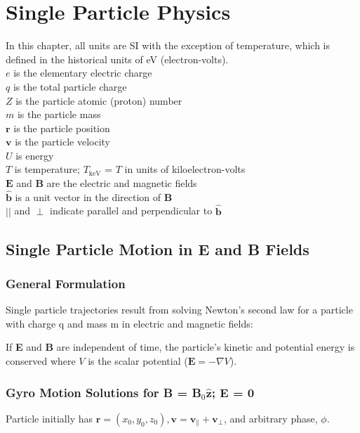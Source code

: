 \chapter{Single Particle Physics}
In this chapter, all units are SI with the exception of temperature,
which is defined in the historical units of eV (electron-volts).\\

\noindent
$e$ is the elementary electric charge\\
$q$ is the total particle charge\\
$Z$ is the particle atomic (proton) number\\
$m$ is the particle mass\\
$\textbf{r}$ is the particle position\\
$\textbf{v}$ is the particle velocity\\
$U$ is energy\\
$T$ is temperature; $T_\mathrm{keV}$ = $T$ in units of kiloelectron-volts\\
$\textbf{E}$ and $\textbf{B}$ are the electric and magnetic fields\\
$\hat{\textbf{b}}$ is a unit vector in the direction of $\textbf{B}$\\
$||$ and $\perp$ indicate parallel and perpendicular to $\hat{\textbf{b}}$\\

\section{Single Particle Motion in \textbf{E} and \textbf{B} Fields}

\subsection{General Formulation}
Single particle trajectories result from solving Newton's second law
for a particle with charge q and mass m in electric and magnetic fields: 

\noindent
If \textbf{E} and \textbf{B} are independent of time, the particle's kinetic and potential
energy is conserved 
\indent
where $V$ is the scalar potential ($\textbf{E} = -\nabla V$).

\subsection{Gyro Motion Solutions for \textbf{B} = B$_0\boldsymbol{\hat{z}}$; \textbf{E} = 0}
Particle initially has $\textbf{r} = (x_0,y_0,z_0), \textbf{v} =
\textbf{v}_\parallel + \textbf{v}_\perp$, and arbitrary phase, $\phi$.\\


